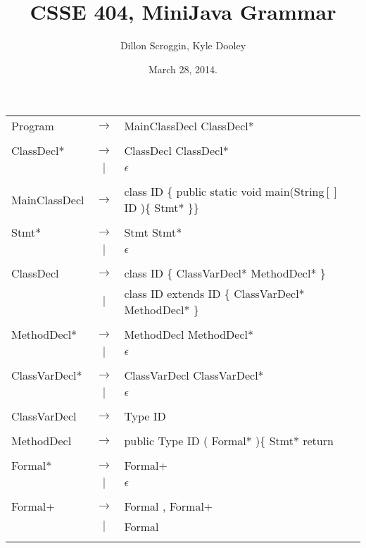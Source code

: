 \documentclass{article}
\author{Dillon Scroggin, Kyle Dooley}
\title{CSSE 404, MiniJava Grammar}
\date{March 28, 2014.}
\begin{document}
\maketitle

\begin{tabular}{ l c l }
	Program & $\rightarrow$ & MainClassDecl ClassDecl* \\
	\\

	ClassDecl* & $\rightarrow$ & ClassDecl ClassDecl* \\
	& $|$ & $\epsilon$\\
	\\

	MainClassDecl & $\rightarrow$ & class ID \{ public static void
main(String$[]$ ID )\{ Stmt* \}\} \\
	\\

	Stmt* & $\rightarrow$ & Stmt Stmt* \\
	&$|$&$\epsilon$ \\
	\\

	ClassDecl & $\rightarrow$ & class ID \{ ClassVarDecl* MethodDecl* \} \\
	& $|$ & class ID extends ID \{ ClassVarDecl* MethodDecl* \} \\
	\\

	MethodDecl* & $\rightarrow$ & MethodDecl MethodDecl* \\
	&$|$&$\epsilon$ \\
	\\
	
	ClassVarDecl* & $\rightarrow$ & ClassVarDecl ClassVarDecl* \\
	&$|$&$\epsilon$ \\
	\\

	ClassVarDecl & $\rightarrow$ & Type ID \\
	\\

	MethodDecl & $\rightarrow$ & public Type ID ( Formal* )\{ Stmt* return \\ 
	\\

	Formal* & $\rightarrow$ & Formal+ \\
	& $|$ & $\epsilon$ \\
	\\

	Formal+ & $\rightarrow$ & Formal , Formal+ \\
  	& $|$ & Formal \\
	\\


\end{tabular}
\end{document}
